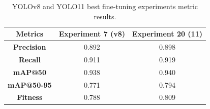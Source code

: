 \begin{table}[h!]
\centering
\renewcommand{\arraystretch}{1.3} %
\begin{tabular}{|c|c|c|}
\hline
\textbf{Metrics} & \textbf{Experiment 7 (v8)} & \textbf{Experiment 20 (11)} \\ \hline
\textbf{Precision} & 0.892  & 0.898  \\ \hline
\textbf{Recall} & 0.911   & 0.919  \\ \hline
\textbf{mAP@50} & 0.938   & 0.940  \\ \hline
\textbf{mAP@50-95} & 0.771  & 0.794  \\ \hline
\textbf{Fitness} & 0.788 &	0.809 \\ \hline
\end{tabular}
\caption{YOLOv8 and YOLO11 best fine-tuning experiments metric results.}
\label{tab:bestfinetuningmetrics}
\end{table}